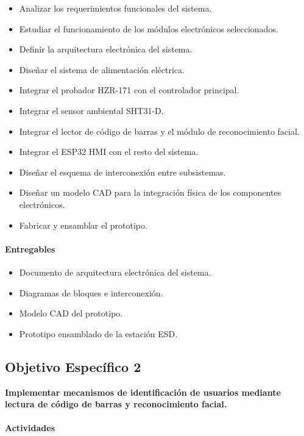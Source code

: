 \begin{itemize}
    \item Analizar los requerimientos funcionales del sistema.
    \item Estudiar el funcionamiento de los módulos electrónicos seleccionados.
    \item Definir la arquitectura electrónica del sistema.
    \item Diseñar el sistema de alimentación eléctrica.
    \item Integrar el probador HZR-171 con el controlador principal.
    \item Integrar el sensor ambiental SHT31-D.
    \item Integrar el lector de código de barras y el módulo de reconocimiento facial.
    \item Integrar el ESP32 HMI con el resto del sistema.
    \item Diseñar el esquema de interconexión entre subsistemas.
    \item Diseñar un modelo CAD para la integración física de los componentes electrónicos.
    \item Fabricar y ensamblar el prototipo.
\end{itemize}

\paragraph{Entregables}

\begin{itemize}
    \item Documento de arquitectura electrónica del sistema.
    \item Diagramas de bloques e interconexión.
    \item Modelo CAD del prototipo.
    \item Prototipo ensamblado de la estación ESD.
\end{itemize}


\subsection{Objetivo Específico 2}

\textbf{Implementar mecanismos de identificación de usuarios mediante lectura de código de barras y reconocimiento facial.}

\paragraph{Actividades}

